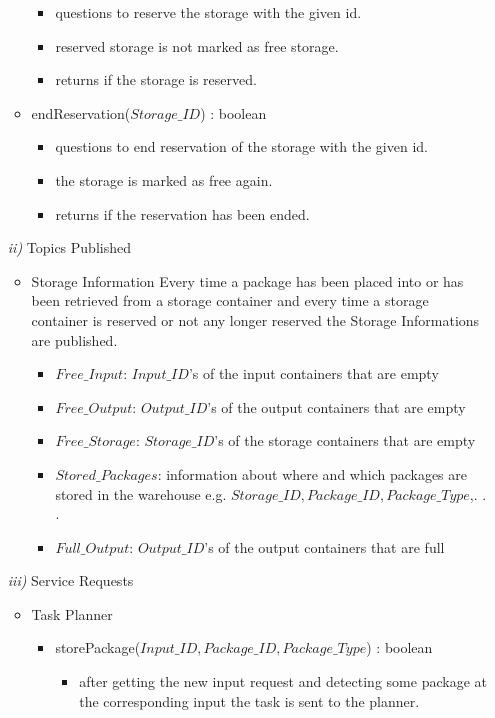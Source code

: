 \documentclass{article}
\begin{document}
\begin{enumerate}
\begin{itemize}
\begin{itemize}
			\item questions to reserve the storage with the given id.
			\item reserved storage is not marked as free storage.
			\item returns if the storage is reserved.
		\end{itemize}
		\item endReservation($Storage\_ID$) : boolean
		\begin{itemize}
			\item questions to end reservation of the storage with the given id.
			\item the storage is marked as free again.
			\item returns if the reservation has been ended.
		\end{itemize}
	\end{itemize}
	\item[\textit{ii)}] Topics Published
	\begin{itemize}
		\item Storage Information
		Every time a package has been placed into or has been retrieved from a storage container and every time a storage container is reserved or not any longer reserved the Storage Informations are published.
		\begin{itemize}
			\item $Free\_Input$: $Input\_ID$'s of the input containers that are empty
			\item $Free\_Output$: $Output\_ID$'s of the output containers that are empty
			\item $Free\_Storage$: $Storage\_ID$'s of the storage containers that are empty
			\item $Stored\_Packages$: information about where and which packages are stored in the warehouse e.g. $Storage\_ID, Package\_ID, Package\_Type$,. . .
			\item $Full\_Output$: $Output\_ID$'s of the output containers that are full
		\end{itemize}
	\end{itemize}
	\item[\textit{iii)}] Service Requests
	\begin{itemize}
		\item Task Planner
		\begin{itemize}
			\item storePackage($Input\_ID, Package\_ID, Package\_Type$) : boolean
			\begin{itemize}
				\item after getting the new input request and detecting some package at the corresponding input the task is sent to the planner.

\end{itemize}
\end{itemize}
\end{itemize}
\end{enumerate}
\end{document}
